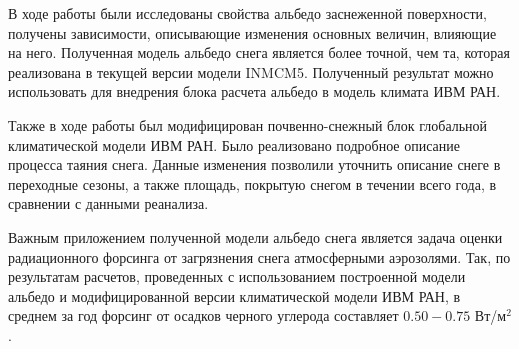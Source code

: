 \documentclass[a4paper, fontsize=14pt]{scrartcl}
\begin{document}
В ходе работы были исследованы свойства альбедо заснеженной поверхности, получены зависимости, описывающие изменения основных величин, влияющие на него. Полученная модель альбедо снега является более точной, чем та, которая реализована в текущей версии модели INMCM5. Полученный результат можно использовать для внедрения блока расчета альбедо в модель климата ИВМ РАН.

Также в ходе работы был модифицирован почвенно-снежный блок глобальной климатической модели ИВМ РАН. Было реализовано подробное описание процесса таяния снега. Данные изменения позволили уточнить описание снеге в переходные сезоны, а также площадь, покрытую снегом в течении всего года, в сравнении с данными реанализа.  

Важным приложением полученной модели альбедо снега является задача оценки радиационного форсинга от загрязнения снега атмосферными аэрозолями. Так, по результатам расчетов, проведенных с использованием построенной модели альбедо и модифицированной версии климатической модели ИВМ РАН, в среднем за год форсинг от осадков черного углерода составляет $0.50 - 0.75$ Вт/м$^2$.




\newpage
{}
{}


\end{document}
